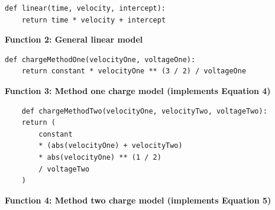 \documentclass[
	letterpaper, %
	10pt, %
]{CSUniSchoolLabReport}
\begin{document}
\begin{verbatim}
def linear(time, velocity, intercept):
    return time * velocity + intercept
\end{verbatim}
\begin{center}
    \textbf{Function 2: General linear model}
\end{center}

\begin{verbatim}
def chargeMethodOne(velocityOne, voltageOne):
    return constant * velocityOne ** (3 / 2) / voltageOne
\end{verbatim}
\begin{center}
    \textbf{Function 3: Method one charge model (implements Equation 4)}
\end{center}

\begin{verbatim}
    def chargeMethodTwo(velocityOne, velocityTwo, voltageTwo):
    return (
        constant
        * (abs(velocityOne) + velocityTwo)
        * abs(velocityOne) ** (1 / 2)
        / voltageTwo
    )
    \end{verbatim}
\begin{center}
    \textbf{Function 4: Method two charge model (implements Equation 5)}
\end{center}
\end{document}
